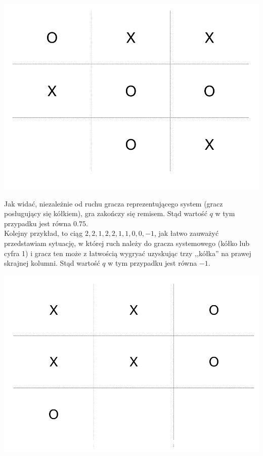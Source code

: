 \documentclass[licencjacka]{pracamgr}
\begin{document}
\begin{flushleft}
	\includegraphics [scale=0.2] {ttt_2.png}
\end{flushleft}
Jak widać, niezależnie od ruchu gracza reprezentującego system (gracz posługujący się kółkiem), gra zakończy się remisem. Stąd wartość $q$ w tym przypadku jest równa $0.75$. \\

Kolejny przykład, to ciąg $2, 2, 1, 2,  2, 1, 1, 0, 0, -1$, jak łatwo zauważyć przedstawiam sytuację, w której  ruch należy do gracza systemowego (kółko lub cyfra 1) i gracz ten może z łatwością wygryać uzyskując trzy ,,kółka'' na prawej skrajnej kolumni. Stąd wartość $q$ w tym przypadku jest równa $-1$.
\begin{flushleft}
	\includegraphics [scale=0.2] {ttt_3.png}
\end{flushleft}
\end{document}
